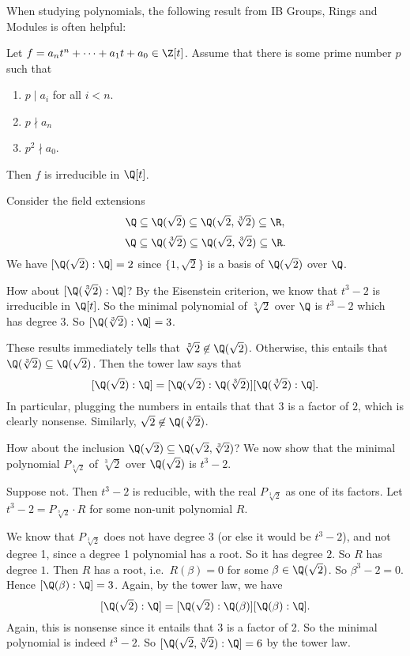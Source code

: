\documentclass[a4paper]{article}
\begin{document}
When studying polynomials, the following result from IB Groups, Rings and Modules is often helpful:
\begin{prop}
  Let $f = a_nt^n + \cdots + a_1 t + a_0\in \Z[t]$. Assume that there is some prime number $p$ such that
  \begin{enumerate}
    \item $ p \mid a_i$ for all $i < n$.
    \item $p \nmid a_n$
    \item $p^2 \nmid a_0$.
  \end{enumerate}
  Then $f$ is irreducible in $\Q[t]$.
\end{prop}

\begin{eg}
  Consider the field extensions
  \[
    \Q \subseteq \Q(\sqrt{2})\subseteq \Q(\sqrt{2}, \sqrt[3]{2})\subseteq \R,
  \]
  \[
    \Q\subseteq \Q(\sqrt[3]{2}) \subseteq \Q(\sqrt{2}, \sqrt[3]{2})\subseteq \R.
  \]
  We have $[\Q(\sqrt{2}): \Q] = 2$ since $\{1, \sqrt{2}\}$ is a basis of $\Q(\sqrt{2})$ over $\Q$.

  How about $[\Q(\sqrt[3]{2}):\Q]$? By the Eisenstein criterion, we know that $t^3 - 2$ is irreducible in $\Q[t]$. So the minimal polynomial of $\sqrt[3]{2}$ over $\Q$ is $t^3 - 2$ which has degree 3. So $[\Q(\sqrt[3]{2}):\Q] = 3$.

  These results immediately tells that $\sqrt[3]{2}\not\in \Q(\sqrt{2})$. Otherwise, this entails that $\Q(\sqrt[3]{2}) \subseteq \Q(\sqrt{2})$. Then the tower law says that
  \[
    [\Q(\sqrt{2}):\Q] = [\Q(\sqrt{2}):\Q(\sqrt[3]{2})][\Q(\sqrt[3]{2}):\Q].
  \]
  In particular, plugging the numbers in entails that that $3$ is a factor of $2$, which is clearly nonsense. Similarly, $\sqrt{2}\not \in \Q(\sqrt[3]{2})$.

  How about the inclusion $\Q(\sqrt{2})\subseteq \Q(\sqrt{2}, \sqrt[3]{2})$? We now show that the minimal polynomial $P_{\sqrt[3]{2}}$ of $\sqrt[3]{2}$ over $\Q(\sqrt{2})$ is $t^3 - 2$.

  Suppose not. Then $t^3 - 2$ is reducible, with the real $P_{\sqrt[3]{2}}$ as one of its factors. Let $t^3 - 2 = P_{\sqrt[3]{2}} \cdot R$ for some non-unit polynomial $R$.

  We know that $P_{\sqrt[3]{2}}$ does not have degree 3 (or else it would be $t^3 - 2$), and not degree 1, since a degree 1 polynomial has a root. So it has degree $2$. So $R$ has degree $1$. Then $R$ has a root, i.e.\ $R(\beta) = 0$ for some $\beta \in \Q(\sqrt{2})$. So $\beta^3 - 2 = 0$. Hence $[\Q(\beta): \Q] = 3$. Again, by the tower law, we have
  \[
    [\Q(\sqrt{2}):\Q] = [\Q(\sqrt{2}):\Q(\beta)][\Q(\beta):\Q].
  \]
  Again, this is nonsense since it entails that 3 is a factor of 2. So the minimal polynomial is indeed $t^3 -2$. So $[\Q(\sqrt{2}, \sqrt[3]{2}):\Q] = 6$ by the tower law.


\end{eg}
\end{document}
